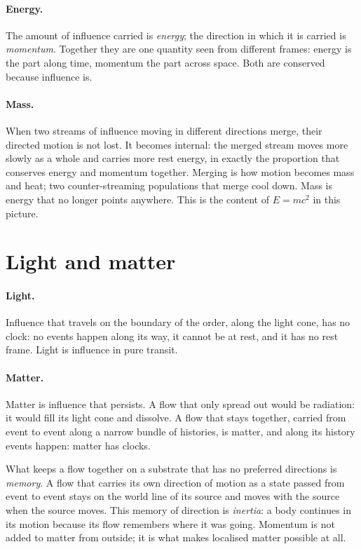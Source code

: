\paragraph{Energy.} The amount of influence carried is \emph{energy}; the direction in which it is
carried is \emph{momentum}. Together they are one quantity seen from different frames: energy is the
part along time, momentum the part across space. Both are conserved because influence is.

\paragraph{Mass.} When two streams of influence moving in different directions merge, their directed
motion is not lost. It becomes internal: the merged stream moves more slowly as a whole and carries
more rest energy, in exactly the proportion that conserves energy and momentum together. Merging is
how motion becomes mass and heat; two counter-streaming populations that merge cool down. Mass is
energy that no longer points anywhere. This is the content of $E=mc^2$ in this picture.

\section{Light and matter}\label{sec:onto-matter}

\paragraph{Light.} Influence that travels on the boundary of the order, along the light cone, has no
clock: no events happen along its way, it cannot be at rest, and it has no rest frame. Light is
influence in pure transit. 

\paragraph{Matter.} Matter is influence that persists. A flow that only spread out would be radiation:
it would fill its light cone and dissolve. A flow that stays together, carried from event to event
along a narrow bundle of histories, is matter, and along its history events happen: matter has
clocks.

What keeps a flow together on a substrate that has no preferred directions is \emph{memory}. A flow
that carries its own direction of motion as a state passed from event to event stays on the world line
of its source and moves with the source when the source moves. This memory of direction is
\emph{inertia}: a body continues in its motion because its flow remembers where it was going.
Momentum is not added to matter from outside; it is what makes localised matter possible at all.

